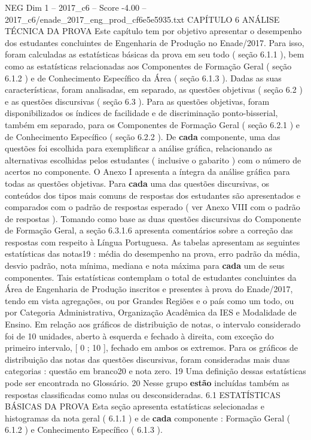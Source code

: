 \begin{textsample}{NEG Dim 1 – 2017\_c6 – Score -4.00 – 2017\_c6/enade\_2017\_eng\_prod\_cf6e5e5935.txt}  \label{ex:f1_neg_147}
CAPÍTULO 6 ANÁLISE TÉCNICA DA PROVA Este capítulo tem por objetivo apresentar o desempenho dos estudantes concluintes de Engenharia de Produção no Enade/2017.
Para isso, foram calculadas as estatísticas básicas da prova em seu todo ( seção 6.1.1 ), bem como as estatísticas relacionadas aos Componentes de Formação Geral ( seção 6.1.2 ) e de Conhecimento Específico da Área ( seção 6.1.3 ).
Dadas as suas características, foram analisadas, em separado, as questões objetivas ( seção 6.2 ) e as questões discursivas ( seção 6.3 ).
Para as questões objetivas, foram disponibilizados os índices de facilidade e de discriminação ponto-bisserial, também em separado, para os Componentes de Formação Geral ( seção 6.2.1 ) e de Conhecimento Específico ( seção 6.2.2 ).
De \textbf{cada} componente, uma das questões foi escolhida para exemplificar a análise gráfica, relacionando as alternativas escolhidas pelos estudantes ( inclusive o gabarito ) com o número de acertos no componente.
O Anexo I apresenta a íntegra da análise gráfica para todas as questões objetivas.
Para \textbf{cada} uma das questões discursivas, os conteúdos dos tipos mais comuns de respostas dos estudantes são apresentados e comparados com o padrão de respostas esperado ( ver Anexo VIII com o padrão de respostas ).
Tomando como base as duas questões discursivas do Componente de Formação Geral, a seção 6.3.1.6 apresenta comentários sobre a correção das respostas com respeito à Língua Portuguesa.
As tabelas apresentam as seguintes estatísticas das notas19 : média do desempenho na prova, erro padrão da média, desvio padrão, nota mínima, mediana e nota máxima para \textbf{cada} um de seus componentes.
Tais estatísticas contemplam o total de estudantes concluintes da Área de Engenharia de Produção inscritos e presentes à prova do Enade/2017, tendo em vista agregações, ou por Grandes Regiões e o país como um todo, ou por Categoria Administrativa, Organização Acadêmica da IES e Modalidade de Ensino.
Em relação aos gráficos de distribuição de notas, o intervalo considerado foi de 10 unidades, aberto à esquerda e fechado à direita, com exceção do primeiro intervalo, [ 0 ; 10 ], fechado em ambos os extremos.
Para os gráficos de distribuição das notas das questões discursivas, foram consideradas mais duas categorias : questão em branco20 e nota zero. 19 Uma definição dessas estatísticas pode ser encontrada no Glossário. 20 Nesse grupo \textbf{estão} incluídas também as respostas classificadas como nulas ou desconsideradas. 6.1 ESTATÍSTICAS BÁSICAS DA PROVA Esta seção apresenta estatísticas selecionadas e histogramas da nota geral ( 6.1.1 ) e de \textbf{cada} componente : Formação Geral ( 6.1.2 ) e Conhecimento Específico ( 6.1.3 ).

\end{textsample}
